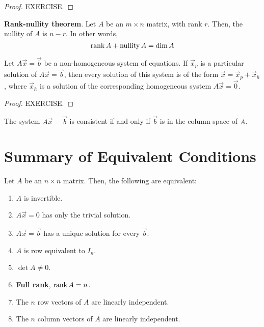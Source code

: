 \documentclass[letterpaper,12pt]{article}
\begin{document}
\begin{proof}
EXERCISE.
\end{proof}

\begin{theorem}
\textbf{Rank-nullity theorem}. Let $A$ be an $m \times n$ matrix, with rank $r$. Then, the nullity of $A$ is $n - r$. In other words,
\begin{equation*}
    \operatorname{rank}{A} + \operatorname{nullity}{A} = \dim{A}
\end{equation*}
\end{theorem}

\begin{theorem}
Let $A \vec{x} = \vec{b}$ be a non-homogeneous system of equations. If $\vec{x}_p$ is a particular solution of $A\vec{x} = \vec{b}$, then every solution of this system is of the form $\vec{x} = \vec{x}_p + \vec{x}_h$, where $\vec{x}_h$ is a solution of the corresponding homogeneous system $A\vec{x} = \vec{0}$.
\end{theorem}
\begin{proof}
EXERCISE.
\end{proof}

\begin{theorem}
The system $A\vec{x} = \vec{b}$ is consistent if and only if $\vec{b}$ is in the column space of $A$.
\end{theorem}


\section*{Summary of Equivalent Conditions}
\begin{theorem}
Let $A$ be an $n \times n$ matrix. Then, the following are equivalent:
\begin{enumerate}
    \item $A$ is invertible.
    \item $A\vec{x} = 0$ has only the trivial solution.
    \item $A\vec{x} = \vec{b}$ has a unique solution for every $\vec{b}$.
    \item $A$ is row equivalent to $I_n$.
    \item $\det{A} \neq 0$.
    \item \textbf{Full rank}, $\operatorname{rank}{A} = n$.
    \item The $n$ row vectors of $A$ are linearly independent.
    \item The $n$ column vectors of $A$ are linearly independent.
\end{enumerate}
\end{theorem}
\end{document}
